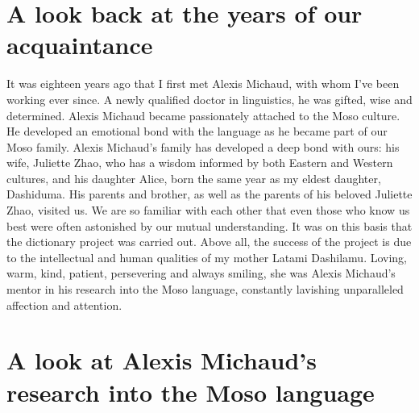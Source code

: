 \section*{A look back at the years of our acquaintance}

It was eighteen years ago that I first met Alexis Michaud, with whom I've been working ever since. A newly qualified doctor in linguistics, he was gifted, wise and determined. Alexis Michaud became passionately attached to the Moso culture. He developed an emotional bond with the language as he became part of our Moso family. Alexis Michaud's family has developed a deep bond with ours: his wife, Juliette Zhao, who has a wisdom informed by both Eastern and Western cultures, and his daughter Alice, born the same year as my eldest daughter, Dashiduma. His parents and brother, as well as the parents of his beloved Juliette Zhao, visited us. We are so familiar with each other that even those who know us best were often astonished by our mutual understanding. It was on this basis that the dictionary project was carried out. Above all, the success of the project is due to the intellectual and human qualities of my mother Latami Dashilamu. Loving, warm, kind, patient, persevering and always smiling, she was Alexis Michaud's mentor in his research into the Moso language, constantly lavishing unparalleled affection and attention.

\section*{A look at Alexis Michaud's research into the Moso language}

